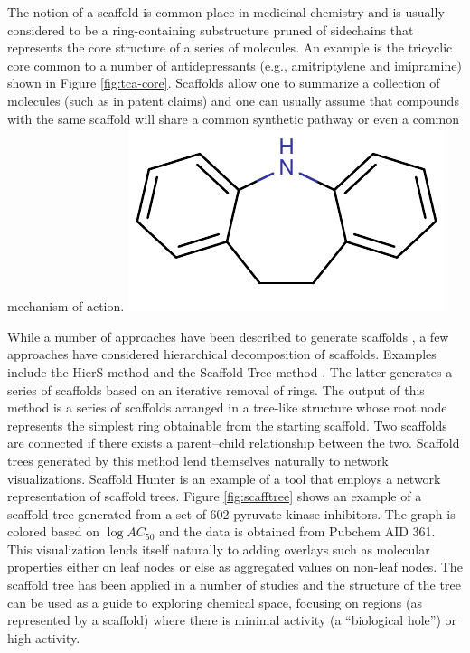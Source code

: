 \documentclass[12pt,letterpaper]{article}
\begin{document}
The notion of a scaffold is common place in medicinal chemistry and is
usually considered to be a ring-containing substructure pruned of
sidechains that represents the core structure of a series of
molecules. An example is the tricyclic core common to a number of
antidepressants (e.g., amitriptylene and imipramine) shown in Figure
\ref{fig:tca-core}. Scaffolds allow one to summarize a collection of
molecules (such as in patent claims) and one can usually assume that
compounds with the same scaffold will share a common synthetic pathway
or even a common mechanism of action.
{}
{\includegraphics{img/tca-core}}


While a number of approaches have been described to generate scaffolds
\cite{Lewell:1998aa,Bemis:1996aa,Katritzky:2000wf}, a few approaches
have considered hierarchical decomposition of scaffolds. Examples
include the HierS method \cite{Wilkens:2005il} and the Scaffold Tree
method \cite{Schuffenhauer:2007oz}. The latter generates a series of
scaffolds based on an iterative removal of rings. The output of this
method is a series of scaffolds arranged in a tree-like structure
whose root node represents the simplest ring obtainable from the
starting scaffold.  Two scaffolds are connected if there exists a
parent--child relationship between the two. Scaffold trees generated
by this method lend themselves naturally to network
visualizations. Scaffold Hunter \cite{Wetzel:2009uq} is an example of
a tool that employs a network representation of scaffold trees. Figure
\ref{fig:scafftree} shows an example of a scaffold tree generated from
a set of 602 pyruvate kinase inhibitors. The graph is colored based on
$\log AC_{50}$ and the data is obtained from Pubchem AID 361. This
visualization lends itself naturally to adding overlays such as
molecular properties either on leaf nodes or else as aggregated values
on non-leaf nodes. The scaffold tree has been applied in a number of
studies \cite{Wetzel:2009uq,Renner:2009wm} and the structure of the
tree can be used as a guide to exploring chemical space, focusing on
regions (as represented by a scaffold) where there is minimal activity
(a ``biological hole'') or high activity.
\end{document}
